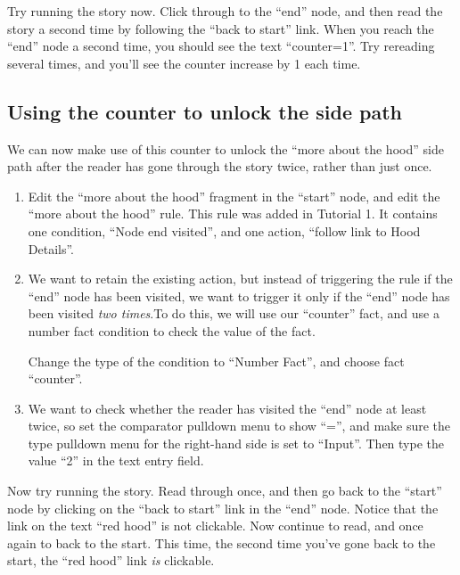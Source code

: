 \documentclass{article}
\begin{document}
Try running the story now. Click through to the ``end'' node, and then read the story a second time by following the ``back to start'' link. When you reach the ``end'' node a second time, you should see the text ``counter=1''. Try rereading several times, and you'll see the counter increase by 1 each time.

\subsection{Using the counter to unlock the side path}

We can now make use of this counter to unlock the ``more about the hood'' side path after the reader has gone through the story twice, rather than just once.

\begin{enumerate}
    \item Edit the ``more about the hood'' fragment in the ``start'' node, and edit the ``more about the hood'' rule. This rule was added in Tutorial 1. It contains one condition, ``Node end visited'', and one action, ``follow link to Hood Details''. 
    \item We want to retain the existing action, but instead of triggering the rule if the ``end'' node has been visited, we want to trigger it only if the ``end'' node has been visited \textit{two times}.To do this, we will use our ``counter'' fact, and use a number fact condition to check the value of the fact. 
    
Change the type of the condition to ``Number Fact'', and choose fact ``counter''.
    \item We want to check whether the reader has visited the ``end'' node at least twice, so set the comparator pulldown menu to show ``='', and make sure the type pulldown menu for the right-hand side is set to ``Input''. Then type the value ``2'' in the text entry field.
\end{enumerate}

\noindent Now try running the story. Read through once, and then go back to the ``start'' node by clicking on the ``back to start'' link in the ``end'' node. Notice that the link on the text ``red hood'' is not clickable. Now continue to read, and once again to back to the start. This time, the second time you've gone back to the start, the ``red hood'' link \textit{is} clickable.
\end{document}
